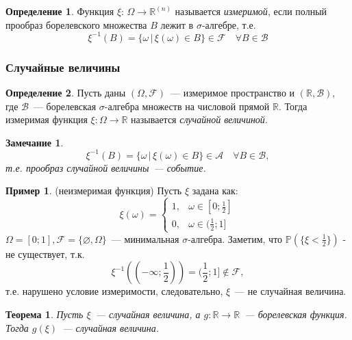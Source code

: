 \documentclass[oneside,final,14pt]{extreport}
\newcommand\myprob[1]{{\mathbb{P}(#1)}}
\newtheorem{thm}{Теорема}[section]
\newtheorem*{rmrk}{Замечание}
\theoremstyle{definition}
\newtheorem{defn}{Определение}[section]
\newtheorem*{exmp}{Пример}
\begin{document}
\begin{defn}
    Функция $\xi$: $\Omega \rightarrow \mathbb{R}^{(n)}$ называется {\it измеримой}, если полный прообраз борелевского множества $B$ лежит в $\sigma$-алгебре, т.е. 
    \begin{equation*}
        \xi^{-1}(B) = \{ \omega \,|\, \xi(\omega) \in B \} \in \mathcal{F} \quad \forall B \in \mathcal{B}
    \end{equation*}
\end{defn}

\subsubsection{Случайные величины}
\begin{defn}
    Пусть даны $(\Omega, \mathcal{F})$~--- измеримое пространство и $(\mathbb{R}, \mathcal{B})$, где $\mathcal{B}$~--- борелевская $\sigma$-алгебра множеств на числовой прямой $\mathbb{R}$. Тогда измеримая функция $\xi: \Omega \to \mathbb{R}$ называется {\it случайной величиной}.
\end{defn}

\begin{rmrk}
\begin{equation*}
    \xi^{-1}(B) = \{\omega \,|\, \xi(\omega) \in B\} \in \mathcal{A} \quad \forall B \in \mathcal{B},
\end{equation*}
    т.е. прообраз случайной величины~--- событие.
\end{rmrk}

\begin{exmp} (неизмеримая функция) Пусть $\xi$ задана как:
\begin{equation*}
    \xi(\omega)=\left\{\begin{array}{ll}
    1, & \omega \in [0; \frac{1}{2}] \\
    0, & \omega \in (\frac{1}{2}; 1]
\end{array}\right.
\end{equation*}
$\Omega = [0; 1], \mathcal{F} = \{\varnothing, \Omega\}$~--- минимальная $\sigma$-алгебра.  Заметим, что $\myprob{\{\xi < \frac{1}{2}\}}$ - не существует, т.к.
\begin{equation*}
    \xi^{-1}((-\infty;\frac{1}{2})) = (\frac{1}{2}; 1] \notin \mathcal{F},
\end{equation*}
т.е. нарушено условие измеримости, следовательно, $\xi$~--- не случайная величина.
\end{exmp} 

\begin{thm}
    Пусть $\xi$~--- случайная величина, а $g: \mathbb{R} \rightarrow \mathbb{R}$~--- борелевская функция. Тогда $g(\xi)$~--- случайная величина.
\end{thm}
\end{document}
